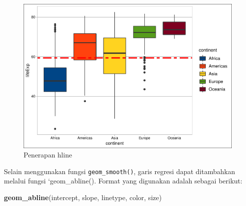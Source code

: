 \documentclass[]{book}
\newenvironment{Shaded}{\begin{snugshade}}{\end{snugshade}}
\newcommand{\KeywordTok}[1]{\textcolor[rgb]{0.13,0.29,0.53}{\textbf{#1}}}
\newcommand{\DataTypeTok}[1]{\textcolor[rgb]{0.13,0.29,0.53}{#1}}
\newcommand{\FloatTok}[1]{\textcolor[rgb]{0.00,0.00,0.81}{#1}}
\newcommand{\StringTok}[1]{\textcolor[rgb]{0.31,0.60,0.02}{#1}}
\newcommand{\CommentTok}[1]{\textcolor[rgb]{0.56,0.35,0.01}{\textit{#1}}}
\newcommand{\OperatorTok}[1]{\textcolor[rgb]{0.81,0.36,0.00}{\textbf{#1}}}
\newcommand{\NormalTok}[1]{#1}
\begin{document}
\begin{Shaded}
\end{Shaded}

\begin{figure}

{\centering \includegraphics[width=0.7\linewidth]{EnvStat_files/figure-latex/gghline-1} 

}

\caption{Penerapan hline}\label{fig:gghline}
\end{figure}

Selain menggunakan fungsi \texttt{geom\_smooth()}, garis regresi dapat
ditambahkan melalui fungsi `geom\_abline(). Format yang digunakan adalah
sebagai berikut:

\begin{Shaded}
\begin{Highlighting}[]
\KeywordTok{geom_abline}\NormalTok{(intercept, slope, linetype, color, size)}
\end{Highlighting}
\end{Shaded}
\end{document}
